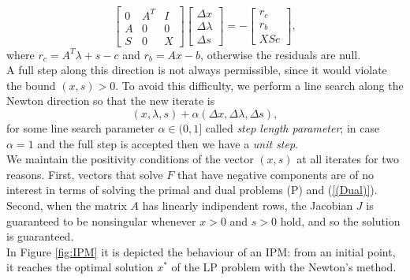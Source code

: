 \documentclass[a4paper,10 pt,titlepage,twoside]{book}
\theoremstyle{plain}
\theoremstyle{definition}
\theoremstyle{remark}
\begin{document}
\begin{equation}\label{(5.1)}
	\begin{bmatrix}
0&A^{T}&I \\A&0&0\\S&0&X
	\end{bmatrix}\begin{bmatrix}
	\Delta x\\\Delta\lambda \\\Delta s
	\end{bmatrix}=-\begin{bmatrix}
	r_{c}\\r_{b}\\XSe
	\end{bmatrix},
\end{equation}
where $r_{c}= A^{T}\lambda+s-c$ and $r_{b}= Ax-b$, otherwise the residuals are null.\\
A full step along this direction is not always permissible, since it would violate the bound $(x,s)>0$. To avoid this difficulty, we perform a line search along the Newton direction so that the new iterate is
\begin{equation*}
	(x,\lambda,s) +\alpha (\Delta x,\Delta \lambda,\Delta s),
\end{equation*} 
for some line search parameter $\alpha \in (0,1]$ called \textit{step length parameter}; in case $\alpha = 1$ and the full step is accepted then we have a \textit{unit step}.\\We maintain the positivity conditions of the vector $(x,s)$ at all iterates for two reasons. First, vectors that solve $\mathit{F}$ that have negative components are of no interest in terms of solving the primal and dual problems (P) and (\ref{(Dual)}). Second, when the matrix $A$ has linearly indipendent rows, the Jacobian $J$ is guaranteed to be nonsingular whenever $x>0$ and $s>0$ hold, and so the solution is guaranteed. %
\\
In Figure \ref{fig:IPM} it is depicted the behaviour of an IPM: from an initial point, it reaches the optimal solution $x^{*}$ of the LP problem \label{LPexample} with the Newton's method.
\end{document}

